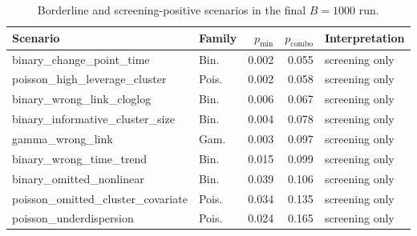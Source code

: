 \begin{table}[H]
\centering
\scriptsize
\caption{Borderline and screening-positive scenarios in the final $B=1000$ run.}
\label{tab:borderline-scenarios}
\begin{tabular}{llrrl}
\toprule
Scenario & Family & $p_{\min}$ & $p_{\mathrm{combo}}$ & Interpretation \\
\midrule
binary\_change\_point\_time & Bin. & 0.002 & 0.055 & screening only \\
poisson\_high\_leverage\_cluster & Pois. & 0.002 & 0.058 & screening only \\
binary\_wrong\_link\_cloglog & Bin. & 0.006 & 0.067 & screening only \\
binary\_informative\_cluster\_size & Bin. & 0.004 & 0.078 & screening only \\
gamma\_wrong\_link & Gam. & 0.003 & 0.097 & screening only \\
binary\_wrong\_time\_trend & Bin. & 0.015 & 0.099 & screening only \\
binary\_omitted\_nonlinear & Bin. & 0.039 & 0.106 & screening only \\
poisson\_omitted\_cluster\_covariate & Pois. & 0.034 & 0.135 & screening only \\
poisson\_underdispersion & Pois. & 0.024 & 0.165 & screening only \\
\bottomrule
\end{tabular}
\end{table}
